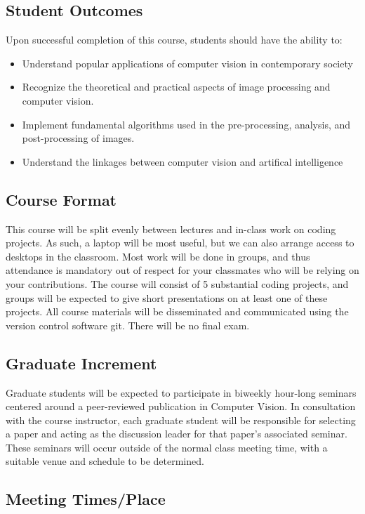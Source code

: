 \documentclass[12pt,letterpaper]{scrartcl}
\begin{document}
\subsection*{Student Outcomes}

Upon successful completion of this course, students should have the ability to:
\begin{itemize}
\item Understand popular applications of computer vision in contemporary society
\item Recognize the theoretical and practical aspects of image processing and computer vision.
\item Implement fundamental algorithms used in the pre-processing, analysis, and post-processing of images.
\item Understand the linkages between computer vision and artifical intelligence
\end{itemize}

\subsection*{Course Format}
This course will be split evenly between lectures and in-class work on coding projects.  As such, a laptop will be most useful, but we can also arrange access to desktops in the classroom.  Most work will be done in groups, and thus attendance is mandatory out of respect for your classmates who will be relying on your contributions.  The course will consist of 5 substantial coding projects, and groups will be expected to give short presentations on at least one of these projects.  All course materials will be disseminated and communicated using the version control software git.  There will be no final exam. 

\subsection*{Graduate Increment}
Graduate students will be expected to participate in biweekly hour-long seminars centered around a peer-reviewed publication in Computer Vision.  In consultation with the course instructor, each graduate student will be responsible for selecting a paper and acting as the discussion leader for that paper's associated seminar.  These seminars will occur outside of the normal class meeting time, with a suitable venue and schedule to be determined. 
\subsection*{Meeting Times/Place}
\end{document}
